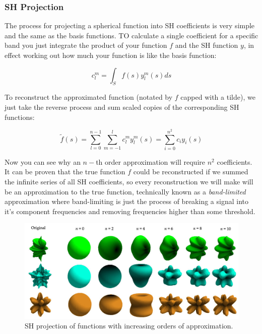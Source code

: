 \subsubsection{SH Projection}
The process for projecting a spherical function into SH coefficients is very simple and the same as the basis functions. TO calculate a single coefficient for a specific band you just integrate the product of your function $f$ and the SH function $y$, in effect working out how much your function is like the basis function:

\begin{equation*}
	c_{l}^{m}=\int_{S}f(s)y^{m}_{l}(s)ds
\end{equation*}

To reconstruct the approximated function (notated by $f$ capped with a tilde), we just take the reverse process and sum scaled copies of the corresponding SH functions:

\begin{equation*}
	\tilde{f}(s)=\sum^{n-1}_{l=0}\sum^{l}_{m=-1}c^{m}_{l}y^{m}_{l}(s)=\sum^{n^{2}}_{i=0}c_iy_i(s)
\end{equation*}

Now you can see why an $n-$th order approximation will require $n^{2}$ coefficients. It can be proven that the true function $f$ could be reconstructed if we summed the infinite series of all SH coefficients, so every reconstruction we will make will be an approximation to the true function, technically known as a \textit{band-limited} approximation where band-limiting is just the process of breaking a signal into it's component frequencies and removing frequencies higher than some threshold.

\begin{figure}
	\includegraphics{graphics/prt/prt-6-2}
	\caption{SH projection of functions with increasing orders of approximation.}
\end{figure}

